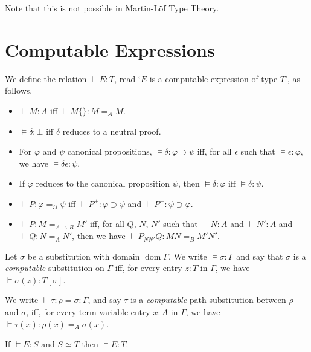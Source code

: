 \documentclass[a4paper,UKenglish]{lipics-v2016}
\newcommand*{\dom}{\ensuremath{\operatorname{dom}}}
\theoremstyle{plain}
\theoremstyle{definition}
\begin{document}
Note that this is not possible in Martin-L\"{o}f Type Theory.

\section{Computable Expressions}

\begin{definition}
We define the relation $\models E : T$, read `$E$ is a computable expression of type $T$', as follows.
\begin{itemize}
\item
$\models M : A$ iff $\models M \{\} : M =_A M$.
\item
$\models \delta : \bot$ iff $\delta$ reduces to a neutral proof.
\item
For $\varphi$ and $\psi$ canonical propositions, $\models \delta : \varphi \supset \psi$ iff, for all $\epsilon$ such that $\models \epsilon : \varphi$, we have $\models \delta \epsilon : \psi$.
\item
If $\varphi$ reduces to the canonical proposition $\psi$, then $\models \delta : \varphi$ iff $\models \delta : \psi$.
\item
$\models P : \varphi =_\Omega \psi$ iff $\models P^+ : \varphi \supset \psi$ and $\models P^- : \psi \supset \varphi$.
\item
$\models P : M =_{A \rightarrow B} M'$ iff, for all $Q$, $N$, $N'$ such that $\models N : A$ and $\models N' : A$ and $\models Q : N =_A N'$, then we have $\models P_{NN'}Q : MN =_B M'N'$.
\end{itemize}
\end{definition}

\begin{definition}
Let $\sigma$ be a substitution with domain $\dom \Gamma$.  We write $\models \sigma : \Gamma$ and say that
$\sigma$ is a \emph{computable} substitution on $\Gamma$ iff, for every entry $z : T$ in $\Gamma$, we have $\models \sigma(z) : T [ \sigma ]$.

We write $\models \tau : \rho = \sigma : \Gamma $, and say $\tau$ is a \emph{computable} path substitution between $\rho$ and $\sigma$, iff, for every term variable entry $x : A$ in $\Gamma$, we have $\models \tau(x) : \rho(x) =_A \sigma(x)$.
\end{definition}

\begin{lemma}[Conversion]
\label{lm:conv-compute}
If $\models E : S$ and $S \simeq T$ then $\models E : T$.
\end{lemma}
\end{document}
